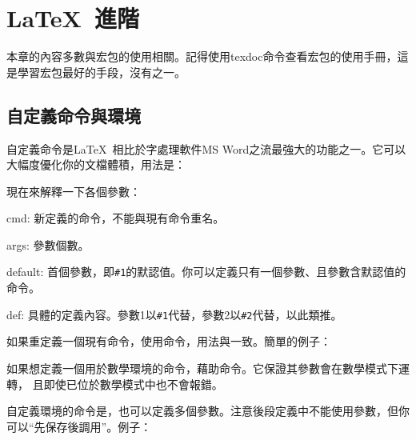 \chapter{\LaTeX\ 進階}

本章的內容多數與宏包的使用相關。記得使用texdoc命令查看宏包的使用手冊，這是學習宏包最好的手段，沒有之一。

\section{自定義命令與環境}
\label{sec:newcommand}
自定義命令是\LaTeX\ 相比於字處理軟件MS Word之流最強大的功能之一。它可以大幅度優化你的文檔體積，用法是：

現在來解釋一下各個參數：
\begin{para}
\item[cmd:] 新定義的命令，不能與現有命令重名。
\item[args:] 參數個數。
\item[default:] 首個參數，即\texttt{\#{}1}的默認值。你可以定義只有一個參數、且參數含默認值的命令。
\item[def:] 具體的定義內容。參數1以\texttt{\#{}1}代替，參數2以\texttt{\#{}2}代替，以此類推。
\end{para}

如果重定義一個現有命令，使用命令，用法與一致。簡單的例子：
\begin{latex}
\newcommand{\concept}[1]{\textbf{#1}}
\newcommand{\cop}[2][]{\textbf{#2}}}
\end{latex}

如果想定義一個用於數學環境的命令，藉助命令。它保證其參數會在數學模式下運轉， 且即使已位於數學模式中也不會報錯。
\begin{latex}
\renewcommand\qedsymbol{\ensuremath{\Box}}
\end{latex}

自定義環境的命令是，也可以定義多個參數。注意後段定義中不能使用參數，但你可以“先保存後調用”。例子：
\begin{latex}
\newenvironment{QuoteEnv}[2][]
    {\newcommand\Qauthor{#1}\newcommand\Qref{#2}}
    {\medskip\begin{flushright}\small ——~\Qauthor\\
    \emph{\Qref}\end{flushright}}
\end{latex}

